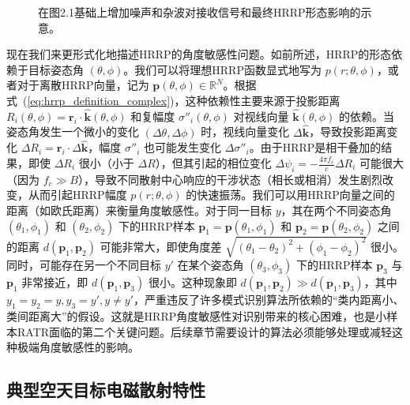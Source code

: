 \begin{figure}[h!]
    \centering
    \caption{在图2.1基础上增加噪声和杂波对接收信号和最终HRRP形态影响的示意。}
    \label{fig:hrrp_formation_noise} %
\end{figure}

现在我们来更形式化地描述HRRP的角度敏感性问题。如前所述，HRRP的形态依赖于目标姿态角 $(\theta, \phi)$。我们可以将理想HRRP函数显式地写为 $p(r; \theta, \phi)$，或者对于离散HRRP向量，记为 $\mathbf{p}(\theta, \phi) \in \mathbb{R}^N$。根据式~(\ref{eq:hrrp_definition_complex})，这种依赖性主要来源于投影距离 $R_i(\theta, \phi) = \mathbf{r}_i \cdot \hat{\mathbf{k}}(\theta, \phi)$ 和复幅度 $\sigma''_i(\theta, \phi)$ 对视线向量 $\hat{\mathbf{k}}(\theta, \phi)$ 的依赖。当姿态角发生一个微小的变化 $(\Delta\theta, \Delta\phi)$ 时，视线向量变化 $\Delta\hat{\mathbf{k}}$，导致投影距离变化 $\Delta R_i = \mathbf{r}_i \cdot \Delta\hat{\mathbf{k}}$，幅度 $\sigma''_i$ 也可能发生变化 $\Delta\sigma''_i$。由于HRRP是相干叠加的结果，即使 $\Delta R_i$ 很小（小于 $\Delta R$），但其引起的相位变化 $\Delta\psi_i = - \frac{4\pi f_c}{c} \Delta R_i$ 可能很大（因为 $f_c \gg B$），导致不同散射中心响应的干涉状态（相长或相消）发生剧烈改变，从而引起HRRP幅度 $p(r; \theta, \phi)$ 的快速振荡。我们可以用HRRP向量之间的距离（如欧氏距离）来衡量角度敏感性。对于同一目标 $y$，其在两个不同姿态角 $(\theta_1, \phi_1)$ 和 $(\theta_2, \phi_2)$ 下的HRRP样本 $\mathbf{p}_1 = \mathbf{p}(\theta_1, \phi_1)$ 和 $\mathbf{p}_2 = \mathbf{p}(\theta_2, \phi_2)$ 之间的距离 $d(\mathbf{p}_1, \mathbf{p}_2)$ 可能非常大，即使角度差 $\sqrt{(\theta_1-\theta_2)^2 + (\phi_1-\phi_2)^2}$ 很小。同时，可能存在另一个不同目标 $y'$ 在某个姿态角 $(\theta_3, \phi_3)$ 下的HRRP样本 $\mathbf{p}_3$ 与 $\mathbf{p}_1$ 非常接近，即 $d(\mathbf{p}_1, \mathbf{p}_3)$ 很小。这种现象即 $d(\mathbf{p}_1, \mathbf{p}_2) \gg d(\mathbf{p}_1, \mathbf{p}_3)$，其中 $y_1=y_2=y, y_3=y', y \neq y'$，严重违反了许多模式识别算法所依赖的“类内距离小、类间距离大”的假设。这就是HRRP角度敏感性对识别带来的核心困难，也是小样本RATR面临的第二个关键问题。后续章节需要设计的算法必须能够处理或减轻这种极端角度敏感性的影响。

\subsection{典型空天目标电磁散射特性}
\label{subsec:scattering_characteristics}

